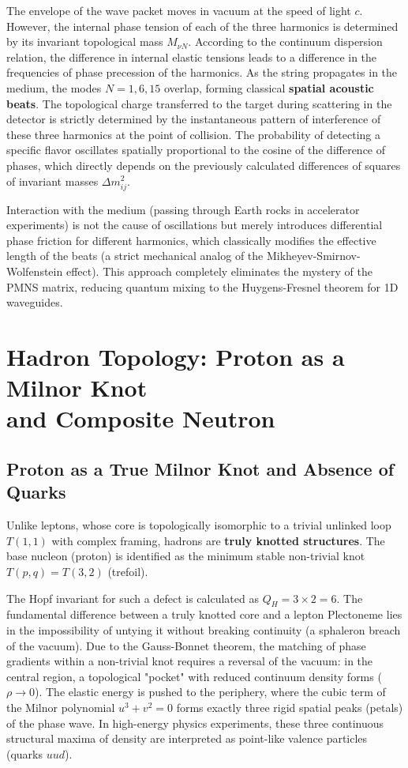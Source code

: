 \documentclass[11pt,a4paper]{article}
\begin{document}
	The envelope of the wave packet moves in vacuum at the speed of light $c$. However, the internal phase tension of each of the three harmonics is determined by its invariant topological mass $M_{\nu N}$. According to the continuum dispersion relation, the difference in internal elastic tensions leads to a difference in the frequencies of phase precession of the harmonics.
	As the string propagates in the medium, the modes $N=1, 6, 15$ overlap, forming classical \textbf{spatial acoustic beats}. 
	The topological charge transferred to the target during scattering in the detector is strictly determined by the instantaneous pattern of interference of these three harmonics at the point of collision. The probability of detecting a specific flavor oscillates spatially proportional to the cosine of the difference of phases, which directly depends on the previously calculated differences of squares of invariant masses $\Delta m^2_{ij}$.
	
	Interaction with the medium (passing through Earth rocks in accelerator experiments) is not the cause of oscillations but merely introduces differential phase friction for different harmonics, which classically modifies the effective length of the beats (a strict mechanical analog of the Mikheyev-Smirnov-Wolfenstein effect). This approach completely eliminates the mystery of the PMNS matrix, reducing quantum mixing to the Huygens-Fresnel theorem for 1D waveguides.
	
\section{Hadron Topology: Proton as a Milnor Knot \\ and Composite Neutron}
	
\subsection{Proton as a True Milnor Knot and Absence of Quarks}
	Unlike leptons, whose core is topologically isomorphic to a trivial unlinked loop $T(1,1)$ with complex framing, hadrons are \textbf{truly knotted structures}. 
	The base nucleon (proton) is identified as the minimum stable non-trivial knot $T(p,q) = T(3,2)$ (trefoil).
	
	The Hopf invariant for such a defect is calculated as $Q_H = 3 \times 2 = 6$. 
	The fundamental difference between a truly knotted core and a lepton Plectoneme lies in the impossibility of untying it without breaking continuity (a sphaleron breach of the vacuum). Due to the Gauss-Bonnet theorem, the matching of phase gradients within a non-trivial knot requires a reversal of the vacuum: in the central region, a topological "pocket" with reduced continuum density forms ($\rho \to 0$).
	The elastic energy is pushed to the periphery, where the cubic term of the Milnor polynomial $u^3+v^2=0$ forms exactly three rigid spatial peaks (petals) of the phase wave. In high-energy physics experiments, these three continuous structural maxima of density are interpreted as point-like valence particles (quarks $uud$).
	
\end{document}

